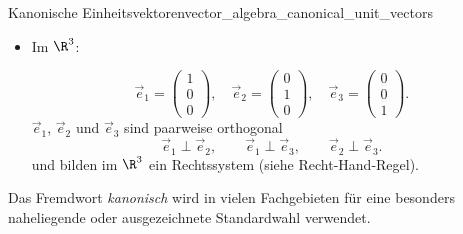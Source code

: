 \begin{DefinitionBox}{Kanonische Einheitsvektoren}{vector_algebra_canonical_unit_vectors}
\begin{itemize}[leftmargin=1.5em,itemsep=0.9em]
    \item Im $\R^3$:
      \par\smallskip
      \begin{minipage}[c]{0.47\linewidth}
        \[
          \vec e_1=\begin{pmatrix}1\\0\\0\end{pmatrix},
          \quad
          \vec e_2=\begin{pmatrix}0\\1\\0\end{pmatrix},
          \quad
          \vec e_3=\begin{pmatrix}0\\0\\1\end{pmatrix}.
        \]
        \vspace{0.5cm}
        $\vec e_1$, $\vec e_2$ und $\vec e_3$ sind paarweise orthogonal
        \[
          \vec e_1\perp\vec e_2,
          \qquad
          \vec e_1\perp\vec e_3,
          \qquad
          \vec e_2\perp\vec e_3.
        \]
        und bilden im $\R^3$ ein Rechtssystem (siehe Recht-Hand-Regel).
      \end{minipage}\hfill
      \begin{minipage}[c]{0.47\linewidth}
        \centering
      \end{minipage}
  \end{itemize}
\end{DefinitionBox}

Das Fremdwort \emph{kanonisch} wird in vielen Fachgebieten für eine besonders
naheliegende oder ausgezeichnete Standardwahl verwendet.

